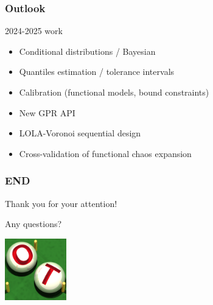 \documentclass[aspectratio=169]{beamer}
\begin{document}

\begin{frame}
\frametitle{Outlook}
\begin{block}{2024-2025 work}
\begin{itemize}
\item Conditional distributions / Bayesian
\item Quantiles estimation / tolerance intervals
\item Calibration (functional models, bound constraints)
\item New GPR API
\item LOLA-Voronoi sequential design
\item Cross-validation of functional chaos expansion
\end{itemize}
\end{block}
\end{frame}


\begin{frame}
\frametitle{END}

Thank you for your attention!

Any questions?

\begin{center}
\includegraphics[width=0.2\textwidth]{figures/logo-ot-small}
\end{center}

\end{frame}

% 
% 
% 
% 
\end{document}
